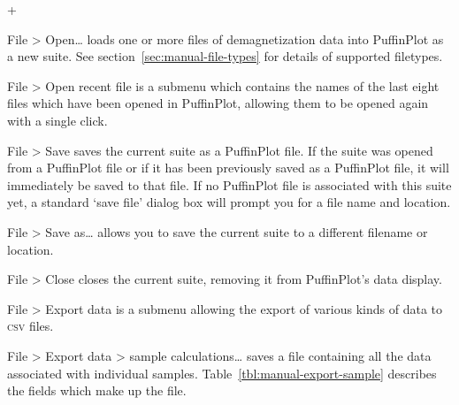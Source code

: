 \documentclass[a4paper]{article}
\newcommand{\menuitemlabel}[1]{%
\mbox{\textsf{#1}}\hfil}
\newenvironment{menuitemlist}%
{\begin{list}{}{%
\renewcommand{\makelabel}{\menuitemlabel}%
\setlength{\labelwidth}{35pt}%
\setlength{\leftmargin}%
             {\labelwidth+\labelsep}}}%
{\end{list}}
\newcommand{\caps}[1]{\textsc{#1}} %
\newcommand{\submenu}{ \textgreater{} } %
\begin{document}
\begin{menuitemlist}

\item[File\submenu Open\ldots] loads one or more files of demagnetization
  data into PuffinPlot as a new suite. See
  section~\ref{sec:manual-file-types} for details of supported filetypes.

\item[File\submenu Open recent file] is a submenu which
contains the names of the last eight files which have been opened in
PuffinPlot, allowing them to be opened again with a single click.

\item[File\submenu Save] saves the current suite as a PuffinPlot file. If
the suite was opened from a PuffinPlot file or if it has been previously
saved as a PuffinPlot file, it will immediately be saved to that file. If no
PuffinPlot file is associated with this suite yet, a standard ‘save file’
dialog box will prompt you for a file name and location.

\item[File\submenu Save as\ldots] allows you to save the current suite to a
different filename or location.

\item[File\submenu Close] closes the current suite, removing it from
PuffinPlot's data display.

\item[File\submenu Export data] is a submenu allowing the export of
various kinds of data to \caps{csv} files.

\item[File\submenu Export data\submenu sample calculations\ldots] saves a file
containing all the data associated with individual samples.
Table~\ref{tbl:manual-export-sample} describes the fields which make
up the file.


\end{menuitemlist}
\end{document}
